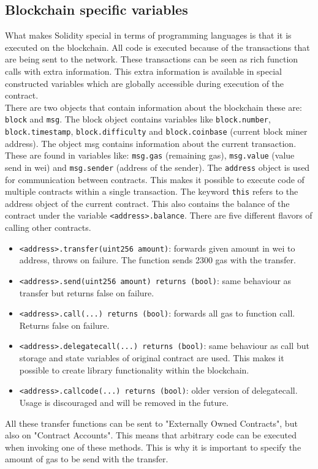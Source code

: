 \documentclass[a4paper]{article}
\begin{document}
\subsection{Blockchain specific variables}
What makes Solidity special in terms of programming languages is that it is executed on the blockchain. All code is executed because of the transactions that are being sent to the network. These transactions can be seen as rich function calls with extra information. This extra information is available in special constructed variables which are globally accessible during execution of the contract.\\
There are two objects that contain information about the blockchain these are: \texttt{block} and \texttt{msg}. The block object contains variables like \texttt{block.number}, \texttt{block.timestamp}, \texttt{block.difficulty} and \texttt{block.coinbase} (current block miner address). The object msg contains information about the current transaction. These are found in variables like: \texttt{msg.gas} (remaining gas), \texttt{msg.value} (value send in wei) and \texttt{msg.sender} (address of the sender).
The \texttt{address} object is used for communication between contracts. This makes it possible to execute code of multiple contracts within a single transaction. The keyword \texttt{this} refers to the address object of the current contract. This also contains the balance of the contract under the variable \texttt{<address>.balance}. There are five different flavors of calling other contracts.
\begin{itemize}
    \item \texttt{<address>.transfer(uint256 amount)}: forwards given amount in wei to address, throws on failure. The function sends 2300 gas with the transfer. 
    \item \texttt{<address>.send(uint256 amount) returns (bool)}: same behaviour as transfer but returns false on failure.
    \item \texttt{<address>.call(...) returns (bool)}: forwards all gas to function call. Returns false on failure.
    \item \texttt{<address>.delegatecall(...) returns (bool)}: same behaviour as call but storage and state variables of original contract are used. This makes it possible to create library functionality within the blockchain.
    \item \texttt{<address>.callcode(...) returns (bool)}: older version of delegatecall. Usage is discouraged and will be removed in the future.
\end{itemize}
All these transfer functions can be sent to "Externally Owned Contracts", but also on "Contract Accounts". This means that arbitrary code can be executed when invoking one of these methods. This is why it is important to specify the amount of gas to be send with the transfer.
\end{document}
